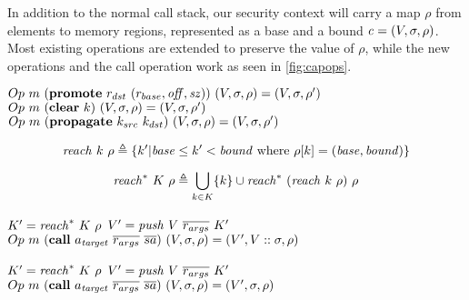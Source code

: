 \documentclass[10pt,conference]{ieeetran}%
\theoremstyle{definition}
\begin{document}
In addition to the normal call stack, our security context will carry a map \(\rho\) from
elements to memory regions, represented as a base and a bound \(\mathit{c} = (V, \sigma, \rho)\).
Most existing operations are extended to preserve the value of \(\rho\), while the new operations
and the call operation work as seen in \cref{fig:capops}.

\begin{figure*}
             {\(Op ~ m ~ (\mathbf{promote} ~ r_{dst} ~ (r_{base},\mathit{off},\mathit{sz})) ~ (V,\sigma,\rho) = (V,\sigma,\rho')\)}
             {\(Op ~ m ~ (\mathbf{clear} ~ k) ~ (V,\sigma,\rho) = (V,\sigma,\rho')\)}
             {\(Op ~ m ~ (\mathbf{propagate} ~ k_{src} ~ k_{dst}) ~ (V,\sigma,\rho) = (V,\sigma,\rho')\)}

    \[\mathit{reach} ~ k ~ \rho \triangleq \{k' | \mathit{base} \leq k' < \mathit{bound}
    \textnormal{ where } \rho[k] = (\mathit{base},\mathit{bound})\}\]

    \[\mathit{reach}^* ~ K ~ \rho \triangleq \bigcup_{k \in K} \{ k \} \cup \mathit{reach}^* ~ (\mathit{reach} ~ k ~ \rho) ~ \rho\]

    \vspace{\abovedisplayskip}
        {\(K' = \mathit{reach}^* ~ K ~ \rho\)}
        {\(V' = \mathit{push} ~ V ~ \overline{r_{args}} ~ K'\)}
        {\(Op ~ m ~ (\mathbf{call} ~ a_{\mathit{target}} ~ \overline{r_{args}} ~ \overline{sa}) ~ (V,\sigma,\rho) = (V',V::\sigma,\rho)\)}

    \vspace{\abovedisplayskip}
        {\(K' = \mathit{reach}^* ~ K ~ \rho\)}
        {\(V' = \mathit{push} ~ V ~ \overline{r_{args}} ~ K'\)}
        {\(Op ~ m ~ (\mathbf{call} ~ a_{\mathit{target}} ~ \overline{r_{args}} ~ \overline{sa}) ~ (V,\sigma,\rho) = (V',\sigma,\rho)\)}

    \caption{Operations supporting provenance-based protection of passed objects}
    \label{fig:capops}
\end{figure*}
\end{document}
